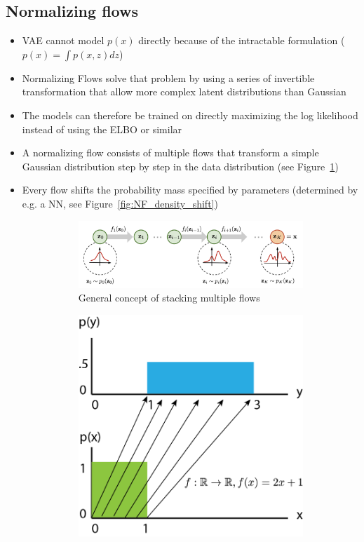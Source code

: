 \subsection{Normalizing flows}
\begin{itemize}
	\item VAE cannot model $p(x)$ directly because of the intractable formulation ($p(x) = \int p(x,z)dz$)
	\item Normalizing Flows solve that problem by using a series of invertible transformation that allow more complex latent distributions than Gaussian
	\item The models can therefore be trained on directly maximizing the log likelihood instead of using the ELBO or similar
	\item A normalizing flow consists of multiple flows that transform a simple Gaussian distribution step by step in the data distribution (see Figure~\ref{fig:NF_concept})
	\item Every flow shifts the probability mass specified by parameters (determined by e.g. a NN, see Figure~\ref{fig:NF_density_shift})
	\begin{figure}[ht!]
		\centering
		\begin{subfigure}{0.7\textwidth}
			\centering
			\includegraphics[width=\textwidth]{figures/NF_concept.png}
			\caption{General concept of stacking multiple flows}
			\label{fig:NF_concept}
		\end{subfigure}
		\hspace{8mm}
		\begin{subfigure}{0.2\textwidth}
			\centering
			\includegraphics[width=\textwidth]{figures/NF_density_shift.png}

\end{subfigure}
\end{figure}
\end{itemize}

